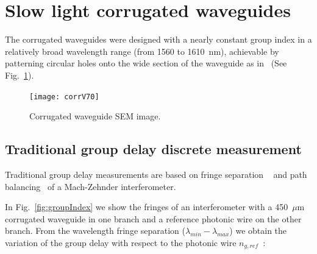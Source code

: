 \documentclass[journal]{IEEEtran}
\begin{document}
\section{Slow light corrugated waveguides}
\label{sec:corrWaveguides}
The corrugated waveguides were designed with a nearly constant group index in a relatively broad wavelength range (from 1560 to 1610~nm), achievable by patterning circular holes onto the wide section of the waveguide as in~\cite{Brimont2010} (See Fig.~\ref{fig:sem}).

\begin{figure}[htb]
	\centering
	\texttt{[image: corrV70]}	
	\caption{Corrugated waveguide SEM image.}
	\label{fig:sem}
 \end{figure}


\subsection{Traditional group delay discrete measurement}
\label{sec:oldTechnique}
Traditional group delay measurements are based on fringe separation ~\cite{shang81,vlasov:05,yao:811,Dulkeith2006} and path balancing~\cite{Cohen:82,Knox:88,Liang:98} of a Mach-Zehnder interferometer.





In Fig.~\ref{fig:groupIndex} we show the fringes of an interferometer with a 450~$\mu$m corrugated waveguide in one branch and a reference photonic wire on the other branch. From the wavelength fringe separation ($ \lambda_{min} - \lambda_{max} $) we obtain the variation of the group delay with respect to the photonic wire $ n_{g,ref} $~\cite{vlasov:05}:
\end{document}
